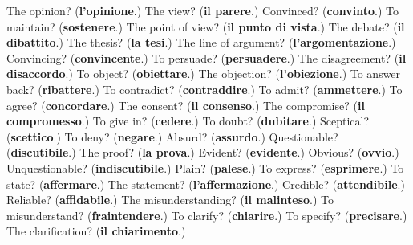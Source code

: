 \begin{tcolorbox}[breakable,colback=teal!4,colframe=teal!35!black,title={Before you move on}]
The opinion? (\textbf{l'opinione}.) The view? (\textbf{il parere}.) Convinced? (\textbf{convinto}.) To maintain? (\textbf{sostenere}.) The point of view? (\textbf{il punto di vista}.) The debate? (\textbf{il dibattito}.) The thesis? (\textbf{la tesi}.) The line of argument? (\textbf{l'argomentazione}.) Convincing? (\textbf{convincente}.) To persuade? (\textbf{persuadere}.) The disagreement? (\textbf{il disaccordo}.) To object? (\textbf{obiettare}.) The objection? (\textbf{l'obiezione}.) To answer back? (\textbf{ribattere}.) To contradict? (\textbf{contraddire}.) To admit? (\textbf{ammettere}.) To agree? (\textbf{concordare}.) The consent? (\textbf{il consenso}.) The compromise? (\textbf{il compromesso}.) To give in? (\textbf{cedere}.) To doubt? (\textbf{dubitare}.) Sceptical? (\textbf{scettico}.) To deny? (\textbf{negare}.) Absurd? (\textbf{assurdo}.) Questionable? (\textbf{discutibile}.) The proof? (\textbf{la prova}.) Evident? (\textbf{evidente}.) Obvious? (\textbf{ovvio}.) Unquestionable? (\textbf{indiscutibile}.) Plain? (\textbf{palese}.) To express? (\textbf{esprimere}.) To state? (\textbf{affermare}.) The statement? (\textbf{l'affermazione}.) Credible? (\textbf{attendibile}.) Reliable? (\textbf{affidabile}.) The misunderstanding? (\textbf{il malinteso}.) To misunderstand? (\textbf{fraintendere}.) To clarify? (\textbf{chiarire}.) To specify? (\textbf{precisare}.) The clarification? (\textbf{il chiarimento}.)
\end{tcolorbox}
